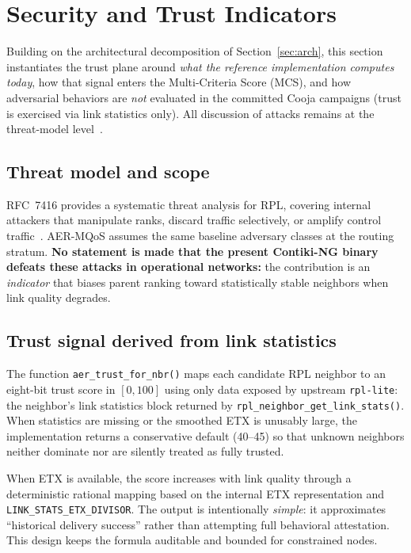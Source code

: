 \section{Security and Trust Indicators}
\label{sec:sec}

Building on the architectural decomposition of Section~\ref{sec:arch}, this section instantiates the trust plane around \emph{what the reference implementation computes today}, how that signal enters the Multi-Criteria Score (MCS), and how adversarial behaviors are \emph{not} evaluated in the committed Cooja campaigns (trust is exercised via link statistics only). All discussion of attacks remains at the threat-model level~\cite{rfc7416,osterlind2006cooja,oikonomou2022contik}.

\subsection{Threat model and scope}
RFC~7416 provides a systematic threat analysis for RPL, covering internal attackers that manipulate ranks, discard traffic selectively, or amplify control traffic~\cite{rfc7416}. AER-MQoS assumes the same baseline adversary classes at the routing stratum. \textbf{No statement is made that the present Contiki-NG binary defeats these attacks in operational networks:} the contribution is an \emph{indicator} that biases parent ranking toward statistically stable neighbors when link quality degrades.

\subsection{Trust signal derived from link statistics}
The function \texttt{aer\_trust\_for\_nbr()} maps each candidate RPL neighbor to an eight-bit trust score in $[0,100]$ using only data exposed by upstream \texttt{rpl-lite}: the neighbor's link statistics block returned by \texttt{rpl\_neighbor\_get\_link\_stats()}. When statistics are missing or the smoothed ETX is unusably large, the implementation returns a conservative default (40--45) so that unknown neighbors neither dominate nor are silently treated as fully trusted.

When ETX is available, the score increases with link quality through a deterministic rational mapping based on the internal ETX representation and \texttt{LINK\_STATS\_ETX\_DIVISOR}. The output is intentionally \emph{simple}: it approximates ``historical delivery success'' rather than attempting full behavioral attestation. This design keeps the formula auditable and bounded for constrained nodes.

